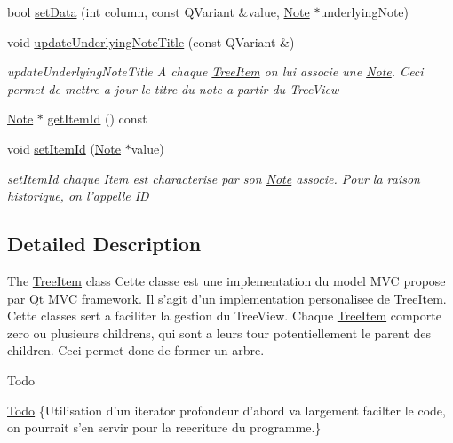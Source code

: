 \begin{DoxyCompactItemize}
bool \hyperlink{class_tree_item_aa648c47b828f4679b6be989d480432de}{set\-Data} (int column, const Q\-Variant \&value, \hyperlink{class_note}{Note} $\ast$underlying\-Note)
\item 
void \hyperlink{class_tree_item_ade9049b23b5ebe1bbede8f404e17f515}{update\-Underlying\-Note\-Title} (const Q\-Variant \&)
\begin{DoxyCompactList}\small\item\em update\-Underlying\-Note\-Title A chaque \hyperlink{class_tree_item}{Tree\-Item} on lui associe une \hyperlink{class_note}{Note}. Ceci permet de mettre a jour le titre du note a partir du Tree\-View \end{DoxyCompactList}\item 
\hyperlink{class_note}{Note} $\ast$ \hyperlink{class_tree_item_a506e8c5257843f55fb54ebd141de1491}{get\-Item\-Id} () const 
\item 
void \hyperlink{class_tree_item_a38d961a2dc1dd59bb2a245e0d8da32aa}{set\-Item\-Id} (\hyperlink{class_note}{Note} $\ast$value)
\begin{DoxyCompactList}\small\item\em set\-Item\-Id chaque Item est characterise par son \hyperlink{class_note}{Note} associe. Pour la raison historique, on l'appelle I\-D \end{DoxyCompactList}\end{DoxyCompactItemize}


\subsection{Detailed Description}
The \hyperlink{class_tree_item}{Tree\-Item} class Cette classe est une implementation du model M\-V\-C propose par Qt M\-V\-C framework. Il s'agit d'un implementation personalisee de \hyperlink{class_tree_item}{Tree\-Item}. Cette classes sert a faciliter la gestion du Tree\-View. Chaque \hyperlink{class_tree_item}{Tree\-Item} comporte zero ou plusieurs childrens, qui sont a leurs tour potentiellement le parent des children. Ceci permet donc de former un arbre. 

\begin{DoxyRefDesc}{Todo}
\item[\hyperlink{todo__todo000002}{Todo}]\{Utilisation d'un iterator profondeur d'abord va largement facilter le code, on pourrait s'en servir pour la reecriture du programme.\} \end{DoxyRefDesc}


